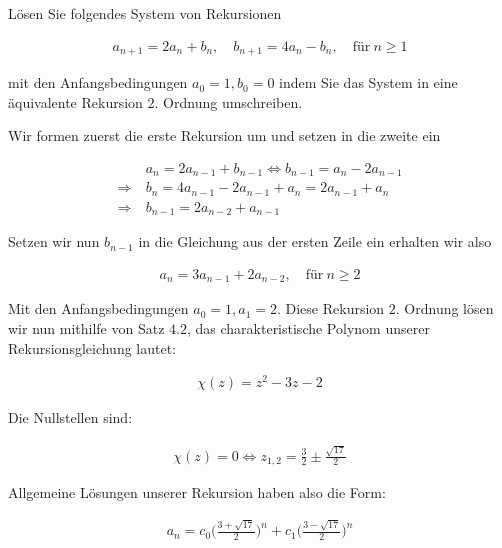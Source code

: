\begin{exercise}
  Lösen Sie folgendes System von Rekursionen

  \begin{align*}
    a_{n+1} = 2 a_n + b_n, \quad b_{n+1} = 4 a_n - b_n, \quad \text{für}~ n \geq 1
  \end{align*}

  mit den Anfangsbedingungen $a_0 = 1, b_0 = 0$ indem Sie das System in eine äquivalente Rekursion $2.$ Ordnung umschreiben.
\end{exercise}


\begin{solution}
  Wir formen zuerst die erste Rekursion um und setzen in die zweite ein

  \begin{align*}
    &a_n = 2a_{n-1} + b_{n-1}
    \Leftrightarrow
    b_{n-1} = a_n - 2a_{n-1} \\
    \Rightarrow~
    & b_n = 4a_{n-1} - 2a_{n-1} + a_n
    =
    2a_{n-1} + a_n\\
    \Rightarrow~
    &b_{n-1} = 2a_{n-2} + a_{n-1}
  \end{align*}

  Setzen wir nun $b_{n-1}$ in die Gleichung aus der ersten Zeile ein erhalten wir also

  \begin{align*}
    a_n
    =
    3a_{n-1} + 2a_{n-2}, \quad \text{für}~ n \geq 2
  \end{align*}

  Mit den Anfangsbedingungen $a_0 = 1, a_1 = 2$. Diese Rekursion $2.$ Ordnung lösen wir nun mithilfe von Satz $4.2$, das charakteristische Polynom unserer Rekursionsgleichung lautet:

  \begin{align*}
    \chi(z)
    =
    z^2 - 3z - 2
  \end{align*}

  Die Nullstellen sind:

  \begin{align*}
    \chi(z) = 0
    \Leftrightarrow
    z_{1,2}
    =
    \frac{3}{2} \pm \frac{\sqrt{17}}{2}
  \end{align*}

  Allgemeine Lösungen unserer Rekursion haben also die Form:

  \begin{align*}
    a_n
    =
    c_0 \Big(\frac{3 +\sqrt{17}}{2}\Big)^n + c_1 \Big(\frac{3 -\sqrt{17}}{2}\Big)^n
  \end{align*}


\end{solution}
